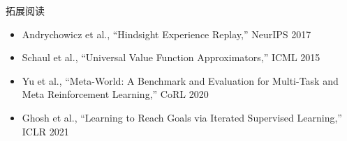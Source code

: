 \begin{knowledgebox}{拓展阅读}
\begin{itemize}
    \item Andrychowicz et al., ``Hindsight Experience Replay,'' NeurIPS 2017
    \item Schaul et al., ``Universal Value Function Approximators,'' ICML 2015
    \item Yu et al., ``Meta-World: A Benchmark and Evaluation for Multi-Task and Meta Reinforcement Learning,'' CoRL 2020
    \item Ghosh et al., ``Learning to Reach Goals via Iterated Supervised Learning,'' ICLR 2021
\end{itemize}
\end{knowledgebox}


